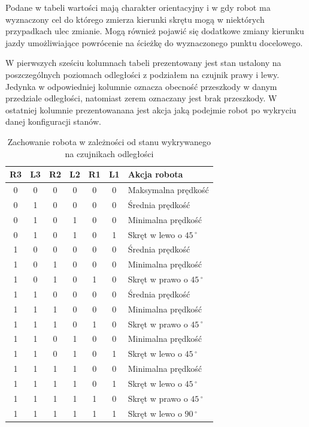 Podane w tabeli wartości mają charakter orientacyjny i w gdy robot ma
wyznaczony cel do którego zmierza kierunki skrętu mogą w niektórych przypadkach
ulec zmianie. Mogą również pojawić się dodatkowe zmiany kierunku jazdy umożliwiające
powrócenie na ścieżkę do wyznaczonego punktu docelowego.

W pierwszych sześciu kolumnach tabeli prezentowany jest stan ustalony na poszczególnych
poziomach odległości z podziałem na czujnik prawy i lewy. Jedynka w odpowiedniej
kolumnie oznacza obecność przeszkody w danym przedziale odległości, natomiast
zerem oznaczany jest brak przeszkody. W ostatniej kolumnie prezentowanana jest
akcja jaką podejmie robot po wykryciu danej konfiguracji stanów.

\begin{table}[hb]
\centering
\caption{Zachowanie robota w zależności od stanu wykrywanego na czujnikach odległości}
   	\begin{tabular}{ | c | c | c | c | c | c | p{4.75cm} |} \hline
   		R3 & L3 & R2 & L2 & R1 & L1 & Akcja robota \\ \hline
   		0  & 0  & 0  & 0  & 0  & 0  & Maksymalna prędkość\\ \hline
   		0  & 1  & 0  & 0  & 0  & 0  & Średnia prędkość \\ \hline
   		0  & 1  & 0  & 1  & 0  & 0  & Minimalna prędkość \\ \hline
   		0  & 1  & 0  & 1  & 0  & 1  & Skręt w lewo o $45\,^{\circ}$ \\ \hline 
   		1  & 0  & 0  & 0  & 0  & 0  & Średnia prędkość \\ \hline
   		1  & 0  & 1  & 0  & 0  & 0  & Minimalna prędkość \\ \hline
   		1  & 0  & 1  & 0  & 1  & 0  & Skręt w prawo o $45\,^{\circ}$  \\ \hline
   		1  & 1  & 0  & 0  & 0  & 0  & Średnia prędkość \\ \hline
   		1  & 1  & 1  & 0  & 0  & 0  & Minimalna prędkość \\ \hline
   		1  & 1  & 1  & 0  & 1  & 0  & Skręt w prawo o $45\,^{\circ}$ \\ \hline
   		1  & 1  & 0  & 1  & 0  & 0  & Minimalna prędkość \\ \hline
   		1  & 1  & 0  & 1  & 0  & 1  & Skręt w lewo o $45\,^{\circ}$ \\ \hline 
   		1  & 1  & 1  & 1  & 0  & 0  & Minimalna prędkość \\ \hline 
   		1  & 1  & 1  & 1  & 0  & 1  & Skręt w lewo o $45\,^{\circ}$ \\ \hline 
   		1  & 1  & 1  & 1  & 1  & 0  & Skręt w prawo o $45\,^{\circ}$ \\ \hline 
   		1  & 1  & 1  & 1  & 1  & 1  & Skręt w lewo o $90\,^{\circ}$ \\ \hline
   	\end{tabular}
\label{ObstacleAvoidTable}
\end{table}

